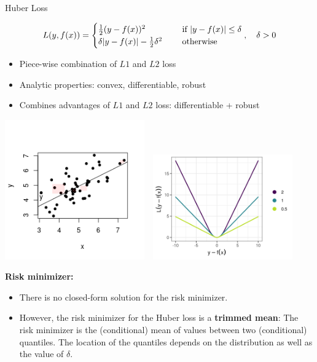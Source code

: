 \begin{vbframe}{Huber Loss}

\vspace*{-0.3cm}

$$
L(y, f(x)) = \begin{cases}
  \frac{1}{2}(y - f(x))^2  & \text{ if } |y - f(x)| \le \delta \\
  \delta |y - f(x)|-\frac{1}{2}\delta^2 \quad & \text{ otherwise }
  \end{cases}, \quad \delta > 0
$$

\begin{itemize}
\item Piece-wise combination of $L1$ and $L2$ loss
\item Analytic properties: convex, differentiable, robust
\item Combines advantages of $L1$ and $L2$ loss: differentiable + robust
\end{itemize}

\vspace*{-1cm}

\begin{center}
\includegraphics[width = 0.45\textwidth]{figure_man/loss_huber_plot3.png}~~\includegraphics[width = 0.45\textwidth]{figure_man/loss_huber_plot2.png}\\
\end{center}

\framebreak 

\textbf{Risk minimizer:}
\begin{itemize}
\item There is no closed-form solution for the risk minimizer. 
\item However, the risk minimizer for the Huber loss is a \textbf{trimmed mean}: The risk minimizer is the (conditional) mean of values between two (conditional) quantiles. The location of the quantiles depends on the distribution as well as 
the value of $\delta$. 
\end{itemize}


\end{vbframe}
